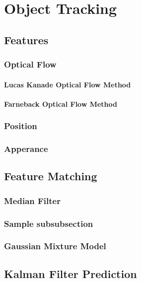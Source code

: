 \chapter{Object Tracking}

\section{Features}
\subsection{Optical Flow}
\subsubsection{Lucas Kanade Optical Flow Method}
\subsubsection{Farneback Optical Flow Method}
\subsection{Position}
\subsection{Apperance}

\section{Feature Matching}
\subsection{Median Filter}
\subsection{Sample subsubsection}
\subsection{Gaussian Mixture Model}

\section{Kalman Filter Prediction}
